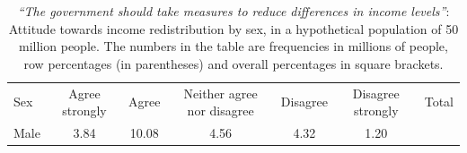 \documentclass[11pt,a4paper,openany]{book}
\begin{document}
\begin{longtable}[]{@{}lcccccr@{}}
\caption{\label{tab:t-sex-attitude-pop} \emph{``The government should take
measures to reduce differences in income levels''}: Attitude towards
income redistribution by sex, in a hypothetical population of 50 million
people. The numbers in the table are frequencies in millions of people,
row percentages (in parentheses) and overall percentages in square
brackets.}\tabularnewline
\toprule
\begin{minipage}[t]{0.05\columnwidth}\raggedright\strut
Sex\strut
\end{minipage} & \begin{minipage}[t]{0.40\columnwidth}\centering\strut
Agree strongly\strut
\end{minipage} & \begin{minipage}[t]{0.07\columnwidth}\centering\strut
Agree\strut
\end{minipage} & \begin{minipage}[t]{0.09\columnwidth}\centering\strut
Neither agree nor disagree\strut
\end{minipage} & \begin{minipage}[t]{0.06\columnwidth}\centering\strut
Disagree\strut
\end{minipage} & \begin{minipage}[t]{0.06\columnwidth}\centering\strut
Disagree strongly\strut
\end{minipage} & \begin{minipage}[t]{0.06\columnwidth}\raggedleft\strut
Total\strut
\end{minipage}\tabularnewline
\begin{minipage}[t]{0.05\columnwidth}\raggedright\strut
Male\strut
\end{minipage} & \begin{minipage}[t]{0.40\columnwidth}\centering\strut
3.84\strut
\end{minipage} & \begin{minipage}[t]{0.07\columnwidth}\centering\strut
10.08\strut
\end{minipage} & \begin{minipage}[t]{0.09\columnwidth}\centering\strut
4.56\strut
\end{minipage} & \begin{minipage}[t]{0.06\columnwidth}\centering\strut
4.32\strut
\end{minipage} & \begin{minipage}[t]{0.06\columnwidth}\centering\strut
1.20\strut
\end{minipage} & \begin{minipage}[t]{0.06\columnwidth}\raggedleft\strut

\end{minipage}
\end{longtable}
\end{document}
